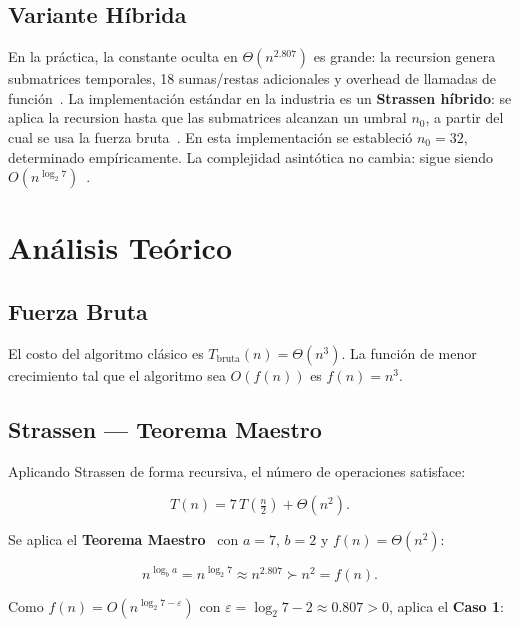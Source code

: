 \documentclass[12pt,a4paper]{article}
\begin{document}
\subsection{Variante H\'ibrida}

En la pr\'actica, la constante oculta en $\Theta(n^{2{.}807})$ es grande: la
recursion genera submatrices temporales, 18 sumas/restas adicionales y overhead
de llamadas de funci\'on~\cite{higham2002accuracy}. La implementaci\'on
est\'andar en la industria es un \textbf{Strassen h\'ibrido}: se aplica la
recursion hasta que las submatrices alcanzan un umbral $n_0$, a partir del cual
se usa la fuerza bruta~\cite{benson2014framework}. En esta implementaci\'on se
estableci\'o $n_0 = 32$, determinado emp\'iricamente. La complejidad asint\'otica
no cambia: sigue siendo $O(n^{\log_2 7})$~\cite{cormen2009introduction}.

\section{An\'alisis Te\'orico}

\subsection{Fuerza Bruta}

El costo del algoritmo cl\'asico es $T_{\text{bruta}}(n) = \Theta(n^3)$.
La funci\'on de menor crecimiento tal que el algoritmo sea $O(f(n))$ es
$\boxed{f(n) = n^3}$.

\subsection{Strassen --- Teorema Maestro}

Aplicando Strassen de forma recursiva, el n\'umero de operaciones satisface:

\begin{equation}
    T(n) = 7\,T\!\left(\tfrac{n}{2}\right) + \Theta(n^2).
    \label{eq:recurrencia}
\end{equation}

Se aplica el \textbf{Teorema Maestro}~\cite{cormen2009introduction} con
$a = 7$, $b = 2$ y $f(n) = \Theta(n^2)$:

\[
n^{\log_b a} = n^{\log_2 7} \approx n^{2{.}807} \succ n^2 = f(n).
\]

Como $f(n) = O\!\left(n^{\log_2 7 - \varepsilon}\right)$ con
$\varepsilon = \log_2 7 - 2 \approx 0{.}807 > 0$, aplica el \textbf{Caso 1}:
\end{document}
